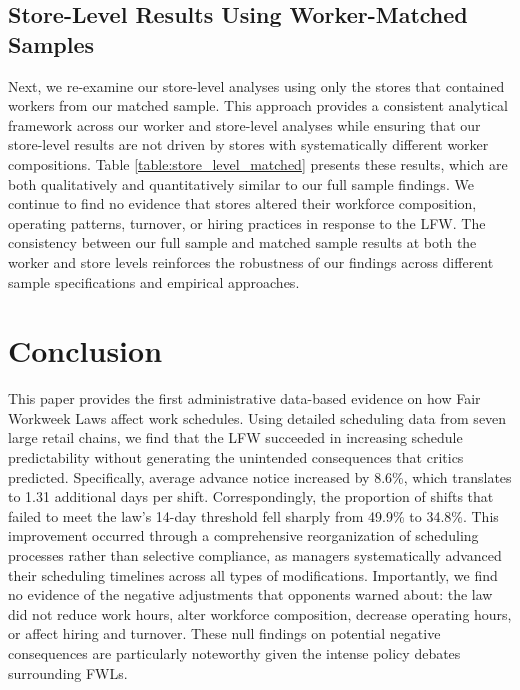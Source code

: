 \documentclass[letterpaper,11pt,leqno]{article}
\theoremstyle{paper}
\begin{document}
\subsection{Store-Level Results Using Worker-Matched Samples}

Next, we re-examine our store-level analyses using only the stores that contained workers from our matched sample. This approach provides a consistent analytical framework across our worker and store-level analyses while ensuring that our store-level results are not driven by stores with systematically different worker compositions. Table \ref{table:store_level_matched} presents these results, which are both qualitatively and quantitatively similar to our full sample findings. We continue to find no evidence that stores altered their workforce composition, operating patterns, turnover, or hiring practices in response to the LFW. The consistency between our full sample and matched sample results at both the worker and store levels reinforces the robustness of our findings across different sample specifications and empirical approaches.







\section{Conclusion} \label{sec:conclusions}

This paper provides the first administrative data-based evidence on how Fair Workweek Laws affect work schedules. Using detailed scheduling data from seven large retail chains, we find that the LFW succeeded in increasing schedule predictability without generating the unintended consequences that critics predicted. Specifically, average advance notice increased by 8.6\%, which translates to 1.31 additional days per shift. Correspondingly, the proportion of shifts that failed to meet the law's 14-day threshold fell sharply from 49.9\% to 34.8\%. This improvement occurred through a comprehensive reorganization of scheduling processes rather than selective compliance, as managers systematically advanced their scheduling timelines across all types of modifications. Importantly, we find no evidence of the negative adjustments that opponents warned about: the law did not reduce work hours, alter workforce composition, decrease operating hours, or affect hiring and turnover. These null findings on potential negative consequences are particularly noteworthy given the intense policy debates surrounding FWLs.
\end{document}
